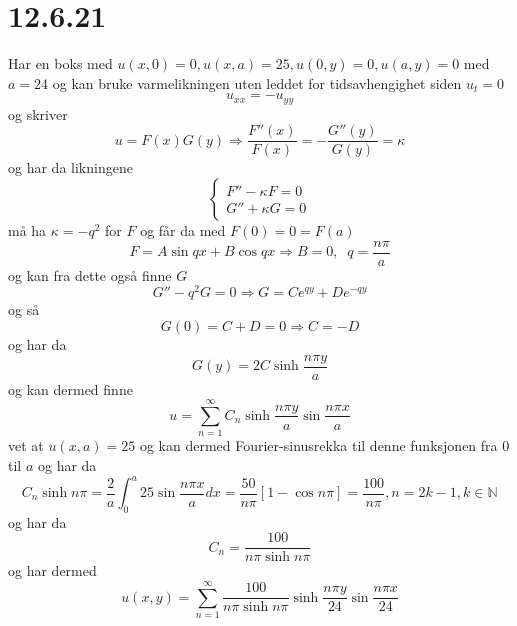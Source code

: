 \documentclass{report}
\newcommand{\M}[2]{\mathbb{#1}^{#2}}
\newcommand{\bbrack}[1]{\left[ #1 \right]}
\begin{document}
\section*{12.6.21}
Har en boks med $u(x, 0) = 0, u(x, a) = 25, u(0, y) = 0, u(a, y) = 0$ med $a=24$ og kan bruke varmelikningen uten leddet for tidsavhengighet siden $u_{t} = 0$
\begin{equation}
  \label{eq:29}
  u_{xx} =  -u_{yy}
\end{equation}
og skriver
\begin{equation}
  \label{eq:30}
  u = F(x) G(y) \Rightarrow \frac{F''(x)}{F(x)} = -\frac{G''(y)}{G(y)} = \kappa
\end{equation}
og har da likningene
\begin{equation}
  \label{eq:31}
  \left\lbrace
  \begin{array}{l}
    F'' - \kappa F = 0 \\
    G'' + \kappa G = 0
  \end{array}
  \right.
\end{equation}
må ha $\kappa = -q^{2}$ for $F$ og får da med $F(0) = 0 = F(a)$
\begin{equation}
  \label{eq:32}
  F = A\sin qx + B\cos qx \Rightarrow B=0, \;\; q = \frac{n\pi}{a}
\end{equation}
og kan fra dette også finne $G$
\begin{equation}
  \label{eq:33}
  G'' - q^{2} G = 0 \Rightarrow G = Ce^{qy} + De^{-qy}
\end{equation}
og så
\begin{equation}
  \label{eq:34}
  G(0) = C + D = 0 \Rightarrow C = -D
\end{equation}
og har da
\begin{equation}
  \label{eq:37}
  G(y) = 2C \sinh \frac{n\pi y}{a}
\end{equation}
og kan dermed finne
\begin{equation}
  \label{eq:36}
  u = \sum_{n=1}^{\infty} C_{n} \sinh \frac{n\pi y}{a} \sin \frac{n\pi x}{a}
\end{equation}
vet at $u(x, a) = 25$ og kan dermed Fourier-sinusrekka til denne funksjonen fra 0 til $a$ og har da
\begin{equation}
  \label{eq:39}
  C_{n} \sinh n\pi = \frac{2}{a} \int_{0}^{a} 25 \sin \frac{n\pi x}{a} dx
  = \frac{50}{n\pi} \bbrack{ 1 - \cos n\pi } = \frac{100}{n\pi}, n = 2k-1, k\in \M{N}{}
\end{equation}
og har da
\begin{equation}
  \label{eq:40}
  C_{n} = \frac{100}{n\pi \sinh n \pi}
\end{equation}
og har dermed
\begin{equation}
  \label{eq:41}
  u(x, y) = \sum_{n=1}^{\infty} \frac{100}{n\pi \sinh n\pi} \sinh \frac{n\pi y}{24} \sin\frac{n\pi x}{24}
\end{equation}
\end{document}
